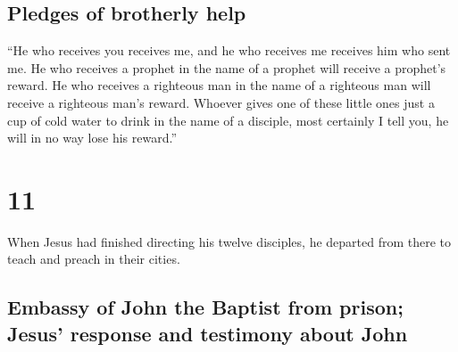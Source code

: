 \hypertarget{pledges-of-brotherly-help}{%
\subsection{Pledges of brotherly help}\label{pledges-of-brotherly-help}}

 ``He who receives you receives me, and he who receives
me receives him who sent me.  He who receives a prophet
in the name of a prophet will receive a prophet's reward. He who
receives a righteous man in the name of a righteous man will receive a
righteous man's reward.  Whoever gives one of these
little ones just a cup of cold water to drink in the name of a disciple,
most certainly I tell you, he will in no way lose his reward.''

\hypertarget{section-10}{%
\section{11}\label{section-10}}

 When Jesus had finished directing his twelve disciples,
he departed from there to teach and preach in their cities.

\hypertarget{embassy-of-john-the-baptist-from-prison-jesus-response-and-testimony-about-john}{%
\subsection{Embassy of John the Baptist from prison; Jesus' response and
testimony about
John}\label{embassy-of-john-the-baptist-from-prison-jesus-response-and-testimony-about-john}}

